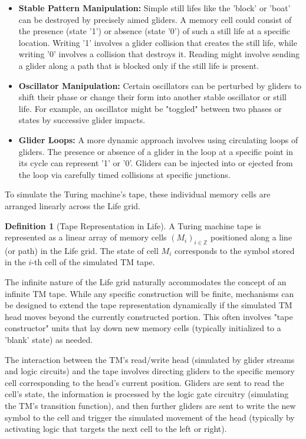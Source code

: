 \documentclass{article}
\theoremstyle{definition}
\newtheorem{definition}{Definition}[section]
\theoremstyle{plain}
\theoremstyle{plain}
\begin{document}
\begin{itemize}
  \item \textbf{Stable Pattern Manipulation:} Simple still lifes like the 'block' or 'boat' can be destroyed by precisely aimed gliders. A memory cell could consist of the presence (state '1') or absence (state '0') of such a still life at a specific location. Writing '1' involves a glider collision that creates the still life, while writing '0' involves a collision that destroys it. Reading might involve sending a glider along a path that is blocked only if the still life is present.
  \item \textbf{Oscillator Manipulation:} Certain oscillators can be perturbed by gliders to shift their phase or change their form into another stable oscillator or still life. For example, an oscillator might be "toggled" between two phases or states by successive glider impacts.
  \item \textbf{Glider Loops:} A more dynamic approach involves using circulating loops of gliders. The presence or absence of a glider in the loop at a specific point in its cycle can represent '1' or '0'. Gliders can be injected into or ejected from the loop via carefully timed collisions at specific junctions.
\end{itemize}

To simulate the Turing machine's tape, these individual memory cells are arranged linearly across the Life grid.

\begin{definition}[Tape Representation in Life]
A Turing machine tape is represented as a linear array of memory cells $(M_i)_{i \in \mathbb{Z}}$ positioned along a line (or path) in the Life grid. The state of cell $M_i$ corresponds to the symbol stored in the $i$-th cell of the simulated TM tape.
\end{definition}

The infinite nature of the Life grid naturally accommodates the concept of an infinite TM tape. While any specific construction will be finite, mechanisms can be designed to extend the tape representation dynamically if the simulated TM head moves beyond the currently constructed portion. This often involves "tape constructor" units that lay down new memory cells (typically initialized to a 'blank' state) as needed.

The interaction between the TM's read/write head (simulated by glider streams and logic circuits) and the tape involves directing gliders to the specific memory cell corresponding to the head's current position. Gliders are sent to read the cell's state, the information is processed by the logic gate circuitry (simulating the TM's transition function), and then further gliders are sent to write the new symbol to the cell and trigger the simulated movement of the head (typically by activating logic that targets the next cell to the left or right).
\end{document}

